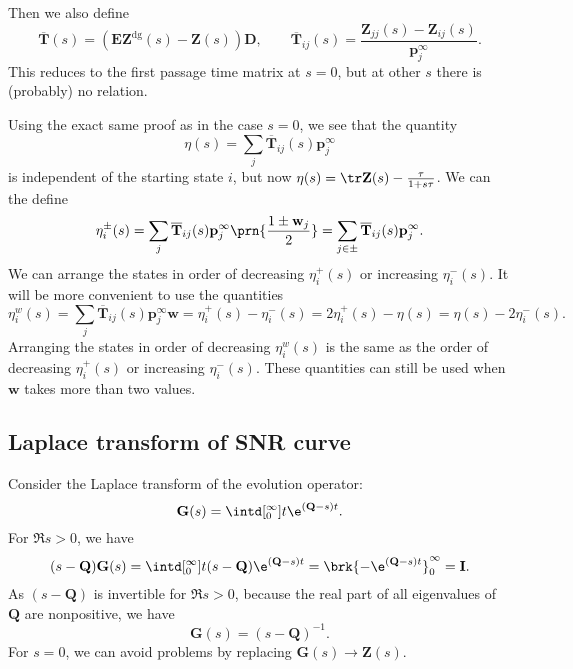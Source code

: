 \documentclass[12pt]{article}
\newcommand{\inv}{^{-1}}
\newcommand{\dg}{^\mathrm{dg}}
\newcommand{\I}{\mathbf{I}}
\newcommand{\onem}{\mathbf{E}}
\newcommand{\MM}{\mathbf{Q}}
\newcommand{\pr}{\mathbf{p}}
\newcommand{\eq}{\pr^\infty}
\newcommand{\fpt}{\mathbf{T}}
\newcommand{\fptb}{\overline{\fpt}}
\newcommand{\fund}{\mathbf{Z}}
\newcommand{\D}{\mathbf{D}}
\newcommand{\w}{\mathbf{w}}
\begin{document}
Then we also define
%
\begin{equation}\label{eq:lfptb}
  \fptb(s) = (\onem\fund\dg(s)-\fund(s))\D,
  \qquad
  \fptb_{ij}(s) = \frac{\fund_{jj}(s)-\fund_{ij}(s)}{\eq_j}.
\end{equation}
%
This reduces to the first passage time matrix at $s=0$, but at other $s$ there is (probably) no relation.

Using the exact same proof as in the case $s=0$, we see that the quantity
%
\begin{equation}\label{eq:lkemeny}
  \eta(s) = \sum_j \fptb_{ij}(s)\eq_j
\end{equation}
%
is independent of the starting state $i$, but now $\eta(s) = \tr\fund(s) - \frac{\tau}{1+s\tau}$.
We can the define
%
\begin{equation}\label{eq:lpmixtime}
  \eta^{\pm}_i(s) = \sum_j \fptb_{ij}(s)\eq_j \prn{\frac{1\pm\w_j}{2}} =  \sum_{j\in\pm} \fptb_{ij}(s)\eq_j.
\end{equation}
%
We can arrange the states in order of decreasing $\eta^{+}_i(s)$ or increasing $\eta^{-}_i(s)$.
It will be more convenient to use the quantities
%
\begin{equation}\label{eq:lwpmixtime}
  \eta^w_i(s) = \sum_j \fptb_{ij}(s)\eq_j \w 
    = \eta^+_i(s) - \eta^-_i(s) =2\eta^+_i(s) - \eta(s) =\eta(s) - 2\eta^-_i(s) .
\end{equation}
%
Arranging the states in order of decreasing $\eta^w_i(s)$ is the same as the order of decreasing $\eta^{+}_i(s)$ or increasing $\eta^{-}_i(s)$.
These quantities can still be used when $\w$ takes more than two values.



\subsection{Laplace transform of SNR curve}\label{sec:laplaceSNR}

Consider the Laplace transform of the evolution operator:
%
\begin{equation}\label{eq:levol}
  \mathbf{G}(s) = \intd[_0^{\infty}]{t} \e^{(\MM-s) t}.
\end{equation}
%
For $\Re s>0$, we have
%
\begin{equation}\label{eq:levolcalc}
  (s-\MM)\mathbf{G}(s) = \intd[_0^{\infty}]{t} (s-\MM)\e^{(\MM-s) t} = \brk{-\e^{(\MM-s) t}}_0^{\infty} = \I.
\end{equation}
%
As $(s-\MM)$ is invertible for $\Re s>0$, because the real part of all eigenvalues of $\MM$ are nonpositive, we have
%
\begin{equation}\label{eq:levolres}
  \mathbf{G}(s) = (s-\MM)\inv.
\end{equation}
%
For $s=0$, we can avoid problems by replacing $\mathbf{G}(s) \to \fund(s)$.
\end{document}
